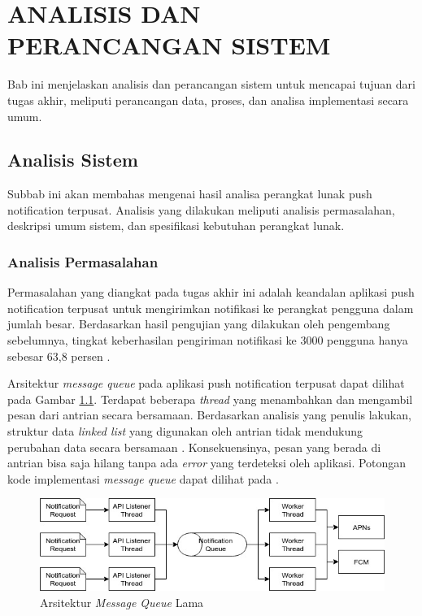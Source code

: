\chapter{ANALISIS DAN PERANCANGAN SISTEM}
\par Bab ini menjelaskan analisis dan perancangan sistem untuk mencapai tujuan dari tugas akhir, meliputi perancangan data, proses, dan analisa implementasi secara umum.

\section{Analisis Sistem}
\par Subbab ini akan membahas mengenai hasil analisa perangkat lunak push notification terpusat.
Analisis yang dilakukan meliputi analisis permasalahan, deskripsi umum sistem, dan spesifikasi kebutuhan perangkat lunak.

\subsection{Analisis Permasalahan}
\par Permasalahan yang diangkat pada tugas akhir ini adalah keandalan aplikasi push notification terpusat untuk mengirimkan notifikasi ke perangkat pengguna dalam jumlah besar. Berdasarkan hasil pengujian yang dilakukan oleh pengembang sebelumnya, tingkat keberhasilan pengiriman notifikasi ke 3000 pengguna hanya sebesar 63,8 persen \cite{application-thesis}.
\par Arsitektur \textit{message queue} pada aplikasi push notification terpusat dapat dilihat pada Gambar \ref{arsitektur_message_queue_lama}. Terdapat beberapa \textit{thread} yang menambahkan dan mengambil pesan dari antrian secara bersamaan. Berdasarkan analisis yang penulis lakukan, struktur data \textit{linked list} yang digunakan oleh antrian tidak mendukung perubahan data secara bersamaan \cite{linkedlist-online}. Konsekuensinya, pesan yang berada di antrian bisa saja hilang tanpa ada \textit{error} yang terdeteksi oleh aplikasi. Potongan kode implementasi \textit{message queue} dapat dilihat pada .
\begin{figure}[H]
	\centering\includegraphics[width=1\textwidth]{bab3/figures/arsitektur_message_queue_lama.jpg}
	\caption{Arsitektur \textit{Message Queue} Lama}
	\label{arsitektur_message_queue_lama}
\end{figure}

